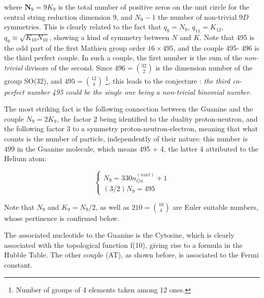 \documentclass[a4paper,9pt]{article}
\begin{document}
where  $\textbf{N}_9 = 9K_9$ is the total number of positive zeros on the unit circle for the central string reduction dimension 9, and $N_{9}-1$ the number of non-trivial $9D$ symmetries. This is clearly related to the fact that $ q_8 = N_9$, $q_{11} = K_{12}$, $q_9\approx \sqrt{K_{10} N_{10}}$, showing a kind of symmetry between $N$ and $K$. Note that 495 is the odd part of the first Mathieu group order $16\times495$, and the couple 495- 496 is the third perfect couple. In such a couple, the first number is the sum of the \textit{non-trivial} divisors of the second. Since $496 = \binom{32}{2}$ is the dimension number of the group SO(32), and $495 = \binom{12}{4}$ \footnote{Number of groups of 4 elements taken among 12 ones.}, this leads to the conjecture : \textit{the third co-perfect number 495 could be the single one being a non-trivial binomial number}. 

The most striking fact is the following connection between the Guanine and the couple $N_9= 2K_9$, the factor 2 being identified to the duality proton-neutron, and the following factor 3 to a symmetry proton-neutron-electron, meaning that what counts is the number of particle, independently of their nature: this number is 499 in the Guanine molecule, which means 495 + 4, the latter 4 attributed to the Helium atom:

\begin{equation}\label{Eq26}
 \left\{
    \begin{array}{ll} 
            N_9 = 330 n_{Gu}^{(nucl)} + 1\\
            (3/2)N_9 = 495 
    \end{array}
\right.
\end{equation}


Note that $N_9$ and $K_9 = N_9/2$, as well as $210 = \binom{10}{4}$ are Euler suitable numbers, whose pertinence is confirmed below.

The associated nucleotide to the Guanine is the Cytosine, which is clearly associated with the topological function f(10), giving rise to a formula in the Hubble Table. The other couple (AT), as shown before, is associated to the Fermi constant.

 
\end{document}
